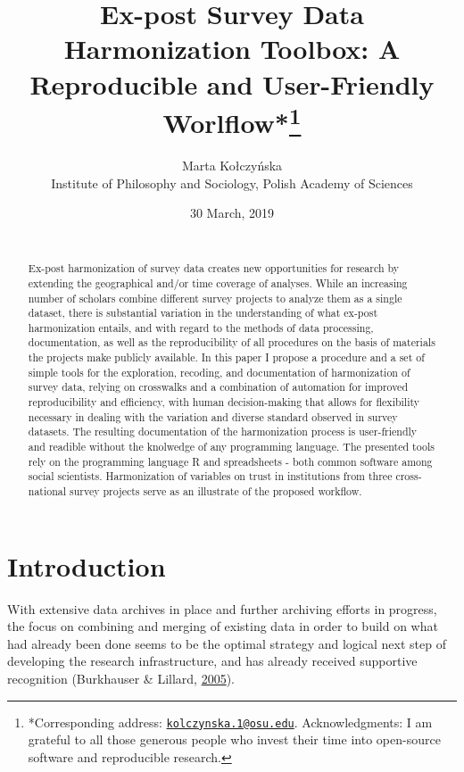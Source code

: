 \documentclass[12pt,]{article}
\title{\vspace{1cm}Ex-post Survey Data Harmonization Toolbox: A Reproducible and User-Friendly Worlflow*\footnote{*Corresponding address: \href{mailto:kolczynska.1@osu.edu}{\nolinkurl{kolczynska.1@osu.edu}}. Acknowledgments: I am grateful to all those generous people who invest their time into open-source software and reproducible research.}\vspace{0.5cm}\\}
\author{Marta Kołczyńska\\
Institute of Philosophy and Sociology, Polish Academy of Sciences}
\date{30 March, 2019\\
~\\}
\begin{document}
\maketitle
\begin{abstract}
\noindent{}Ex-post harmonization of survey data creates new opportunities for research by extending the geographical and/or time coverage of analyses. While an increasing number of scholars combine different survey projects to analyze them as a single dataset, there is substantial variation in the understanding of what ex-post harmonization entails, and with regard to the methods of data processing, documentation, as well as the reproducibility of all procedures on the basis of materials the projects make publicly available. In this paper I propose a procedure and a set of simple tools for the exploration, recoding, and documentation of harmonization of survey data, relying on crosswalks and a combination of automation for improved reproducibility and efficiency, with human decision-making that allows for flexibility necessary in dealing with the variation and diverse standard observed in survey datasets. The resulting documentation of the harmonization process is user-friendly and readible without the knolwedge of any programming language. The presented tools rely on the programming language R and spreadsheets - both common software among social scientists. Harmonization of variables on trust in institutions from three cross-national survey projects serve as an illustrate of the proposed workflow.\vspace{.8cm}
\end{abstract}

\clearpage

\renewcommand{\baselinestretch}{0.5}\normalsize
\tableofcontents
\renewcommand{\baselinestretch}{1.5}\normalsize

\clearpage

\parindent 0.5in

\hypertarget{introduction}{%
\section{Introduction}\label{introduction}}

With extensive data archives in place and further archiving efforts in progress, the focus on combining and merging of existing data in order to build on what had already been done seems to be the optimal strategy and logical next step of developing the research infrastructure, and has already received supportive recognition (Burkhauser \& Lillard, \protect\hyperlink{ref-Burkhauser2005}{2005}).
\end{document}
